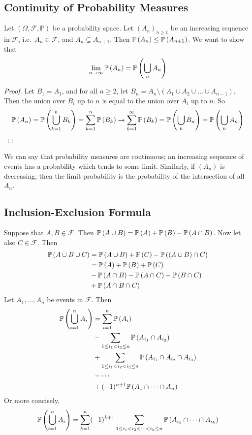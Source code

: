 \subsection{Continuity of Probability Measures}
Let \((\Omega, \mathcal F, \mathbb P)\) be a probability space.
Let \((A_n)_{n \geq 1}\) be an increasing sequence in \(\mathcal F\), i.e.\ \(A_n \in \mathcal F\), and \(A_n \subseteq A_{n+1}\).
Then \(\mathbb{P}\left({A_n}\right) \leq \mathbb{P}\left({A_{n+1}}\right)\).
We want to show that
\[
	\lim_{n \to \infty}\mathbb{P}\left({A_n}\right) = \mathbb{P}\left({\bigcup_n A_n}\right)
\]
\begin{proof}
	Let \(B_1 = A_1\), and for all \(n \geq 2\), let \(B_n = A_n \setminus (A_1 \cup A_2 \cup \dots \cup A_{n-1})\).
	Then the union over \(B_i\) up to \(n\) is equal to the union over \(A_i\) up to \(n\).
	So
	\[
		\mathbb{P}\left({A_n}\right) = \mathbb{P}\left({\bigcup_{k=1}^n B_k}\right) = \sum_{k=1}^n \mathbb{P}\left({B_k}\right) \to \sum_{k=1}^\infty \mathbb{P}\left({B_k}\right) = \mathbb{P}\left({\bigcup_n B_n}\right) = \mathbb{P}\left({\bigcup_n A_n}\right)
	\]
\end{proof}
\noindent We can say that probability measures are continuous; an increasing sequence of events has a probability which tends to some limit.
Similarly, if \((A_n)\) is decreasing, then the limit probability is the probability of the intersection of all \(A_n\).

\subsection{Inclusion-Exclusion Formula}
Suppose that \(A, B \in \mathcal F\).
Then \(\mathbb{P}\left({A \cup B}\right) = \mathbb{P}\left({A}\right) + \mathbb{P}\left({B}\right) - \mathbb{P}\left({A \cap B}\right)\).
Now let also \(C \in \mathcal F\).
Then
\begin{align*}
	\mathbb{P}\left({A \cup B \cup C}\right) & = \mathbb{P}\left({A \cup B}\right) + \mathbb{P}\left({C}\right) - \mathbb{P}\left({(A \cup B) \cap C}\right) \\
	                       & = \mathbb{P}\left({A}\right) + \mathbb{P}\left({B}\right) + \mathbb{P}\left({C}\right)                        \\
	                       & - \mathbb{P}\left({A \cap B}\right) - \mathbb{P}\left({A \cap C}\right) - \mathbb{P}\left({B \cap C}\right)   \\
	                       & + \mathbb{P}\left({A \cap B \cap C}\right)
\end{align*}
Let \(A_1, \dots, A_n\) be events in \(\mathcal F\).
Then
\begin{align*}
	\mathbb{P}\left({\bigcup_{i=1}^n A_i}\right) & = \sum_{i=1}^n \mathbb{P}\left({A_i}\right)                                                      \\
	                           & - \sum_{1 \leq i_1 < i_2 \leq n}\mathbb{P}\left({A_{i_1} \cap A_{i_2}}\right)                    \\
	                           & + \sum_{1 \leq i_1 < i_2 < i_3 \leq n}\mathbb{P}\left({A_{i_1} \cap A_{i_2} \cap A_{i_3}}\right) \\
	                           & - \cdots                                                                       \\
	                           & + (-1)^{n+1}\mathbb{P}\left({A_1 \cap \dots \cap A_n}\right)
\end{align*}
Or more concisely,
\[
	\mathbb{P}\left({\bigcup_{i=1}^n A_i}\right) = \sum_{k=1}^n (-1)^{k+1} \sum_{1 \leq i_1 < i_2 < \dots < i_k \leq n} \mathbb{P}\left({A_{i_1} \cap \dots \cap A_{i_k}}\right)
\]

